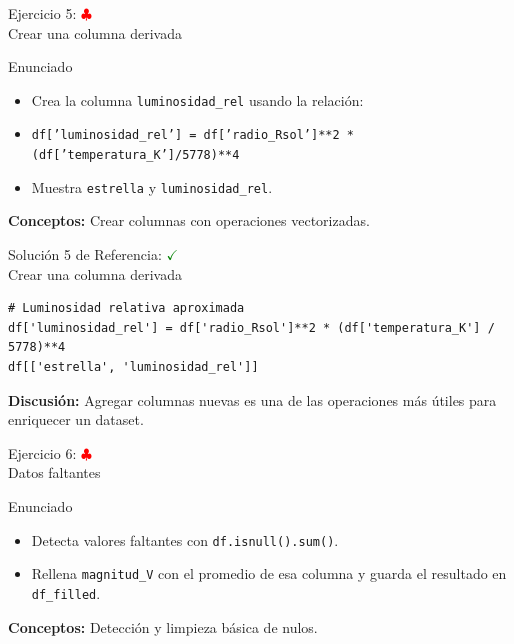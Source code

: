 \documentclass[10pt]{beamer}
\begin{document}
\begin{frame}{Ejercicio 5: \hfill \textcolor{red}{$\clubsuit$} \\ Crear una columna derivada}
\begin{block}{Enunciado}
  \begin{itemize}
    \item Crea la columna \texttt{luminosidad\_rel} usando la relación:
    \item \texttt{df['luminosidad\_rel'] = df['radio\_Rsol']**2 * (df['temperatura\_K']/5778)**4}
    \item Muestra \texttt{estrella} y \texttt{luminosidad\_rel}.
  \end{itemize}
\end{block}
\textbf{Conceptos:} Crear columnas con operaciones vectorizadas.
\end{frame}

\begin{solutionblock}
\begin{frame}[fragile]{Solución 5 de Referencia: \hfill \textcolor{green}{$\checkmark$} \\ Crear una columna derivada}
\begin{verbatim}
# Luminosidad relativa aproximada
df['luminosidad_rel'] = df['radio_Rsol']**2 * (df['temperatura_K'] / 5778)**4
df[['estrella', 'luminosidad_rel']]
\end{verbatim}
\textbf{Discusión:} Agregar columnas nuevas es una de las operaciones más útiles para enriquecer un dataset.
\end{frame}
\end{solutionblock}

\begin{frame}{Ejercicio 6: \hfill \textcolor{red}{$\clubsuit$} \\ Datos faltantes}
\begin{block}{Enunciado}
  \begin{itemize}
    \item Detecta valores faltantes con \texttt{df.isnull().sum()}.
    \item Rellena \texttt{magnitud\_V} con el promedio de esa columna y guarda el resultado en \texttt{df\_filled}.
  \end{itemize}
\end{block}
\textbf{Conceptos:} Detección y limpieza básica de nulos.
\end{frame}
\end{document}

